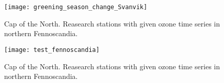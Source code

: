 \documentclass[bg, manuscript]{copernicus}
\begin{document}






\appendix
\section{}    %

\subsection{}     %


\noappendix       %




\appendixfigures  %
\begin{figure}[t]
  \texttt{[image: greening\_season\_change\_Svanvik]}
  \label{fig:greening_season_change_Svanvik}
\caption{Cap of the North. Reasearch stations with given ozone time series in northern Fennoscandia.}
\end{figure}


\begin{figure}[t]
  \texttt{[image: test\_fennoscandia]}
  \label{fig:sunlight_fennoscandia}
\caption{Cap of the North. Reasearch stations with given ozone time series in northern Fennoscandia.}
\end{figure}
\end{document}
